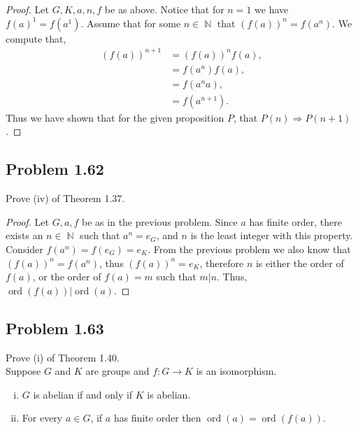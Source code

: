 \documentclass{amsbook}
\DeclareMathOperator{\ord}{\text{ord}}
\DeclareMathOperator{\N}{\mathbb{N}}
\begin{document}
			\begin{proof} Let $G,K,a,n,f$ be as above.
			Notice that for $n=1$ we have $f(a)^{1} = f(a^{1})$.
			Assume that for some $n \in \N$ that $\left( f(a) \right)^{n} = f\left( a^{n} \right)$.
			We compute that,
				\begin{align*}
					\left( f(a) \right)^{n+1} &= \left( f(a) \right)^{n}f(a), \\
					&= f\left(a^{n}\right)f\left(a\right), \\
					&= f\left(a^{n}a\right), \\
					&= f\left(a^{n+1}\right).
				\end{align*}
			Thus we have shown that for the given proposition $P$, that $P(n) \Rightarrow P(n+1)$.			
			\end{proof}

			\subsection*{Problem 1.62}
			\label{sub:problem_1_62}
			Prove (iv) of Theorem 1.37.
			\begin{proof} Let $G,a,f$ be as in the previous problem.
			Since $a$ has finite order, there exists an $n \in \N$ such that $a^{n} = e_{G}$, and $n$ is the least integer with this property.
			Consider $f(a^{n}) = f(e_{G}) = e_{K}$.
			From the previous problem we also know that $\left( f(a) \right)^{n} = f\left( a^{n} \right)$, thus $\left( f(a) \right)^{n} = e_{K}$, therefore $n$ is either the order of $f(a)$, or the order of $f(a) = m$ such that $m|n$.
			Thus, $\ord(f(a))|\ord(a)$.
			\end{proof}

			\subsection*{Problem 1.63}
			\label{sub:problem_1_63}
			Prove (i) of Theorem 1.40.\\

			 Suppose $G$ and $K$ are groups and $f : G \to K$ is an isomorphism.
			\begin{enumerate}[(i)]
				\item $G$ is abelian if and only if $K$ is abelian.
				\item For every $a \in G$, if $a$ has finite order then $\ord(a) = \ord(f(a))$.
			\end{enumerate}
			
\end{document}
